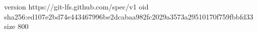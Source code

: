 version https://git-lfs.github.com/spec/v1
oid sha256:ed107e2bd74e443467996be2dcabaa982fc2029a3573a29510170f759fbbfd33
size 800
